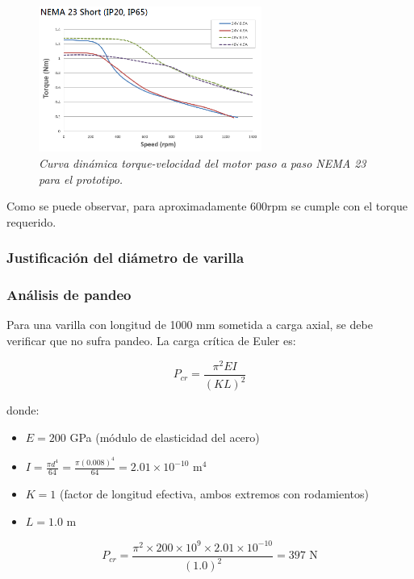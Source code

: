 \begin{figure}[H]
    \centering
    \includegraphics[width=0.65\textwidth]{img/nema23_proto.png}
    \caption{\textit{Curva dinámica torque-velocidad del motor paso a paso NEMA 23 para el prototipo.}}
    \label{fig:Curva_din_nema17medium}
\end{figure}

Como se puede observar, para aproximadamente 600rpm se cumple con el torque requerido.\\

\subsubsection{Justificación del diámetro de varilla}

\subsubsection{Análisis de pandeo}
Para una varilla con longitud de 1000 mm sometida a carga axial, se debe verificar que no sufra pandeo. La carga crítica de Euler es:

\begin{equation}
P_{cr} = \frac{\pi^2 E I}{(K L)^2}
\end{equation}

donde:
\begin{itemize}
    \item $E = 200$ GPa (módulo de elasticidad del acero)
    \item $I = \frac{\pi d^4}{64} = \frac{\pi (0.008)^4}{64} = 2.01 \times 10^{-10}$ m$^4$
    \item $K = 1$ (factor de longitud efectiva, ambos extremos con rodamientos)
    \item $L = 1.0$ m
\end{itemize}

\begin{equation}
P_{cr} = \frac{\pi^2 \times 200 \times 10^9 \times 2.01 \times 10^{-10}}{(1.0)^2} = 397 \text{ N}
\end{equation}


